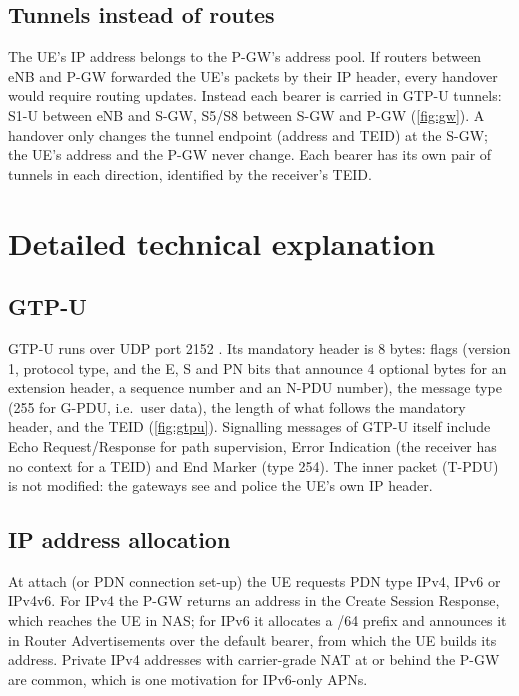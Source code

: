 \documentclass[11pt,a4paper]{article}
\begin{document}
\subsection{Tunnels instead of routes}
The UE's IP address belongs to the P-GW's address pool. If routers between eNB and P-GW forwarded the
UE's packets by their IP header, every handover would require routing updates. Instead each bearer is
carried in GTP-U tunnels: S1-U between eNB and S-GW, S5/S8 between S-GW and P-GW (\cref{fig:gw}). A
handover only changes the tunnel endpoint (address and TEID) at the S-GW; the UE's address and the
P-GW never change. Each bearer has its own pair of tunnels in each direction, identified by the
receiver's TEID.

\begin{acnfigure}
  \caption{S-GW and P-GW on the user-plane path with their main functions.}
  \label{fig:gw}
\end{acnfigure}

\section{Detailed technical explanation}

\subsection{GTP-U}
GTP-U runs over UDP port 2152 \cite{ts29281}. Its mandatory header is 8 bytes: flags (version 1,
protocol type, and the E, S and PN bits that announce 4 optional bytes for an extension header, a sequence
number and an N-PDU number), the message type (255 for G-PDU, i.e.\ user data), the length of what follows
the mandatory header, and the TEID (\cref{fig:gtpu}). Signalling messages of GTP-U itself include Echo
Request/Response for path supervision, Error Indication (the receiver has no context for a TEID) and End
Marker (type 254). The inner packet (T-PDU) is not modified: the gateways see and police the UE's own IP
header.

\begin{acnfigure}
  \caption{GTP-U encapsulation of a user packet and the mandatory GTP-U header.}
  \label{fig:gtpu}
\end{acnfigure}

\subsection{IP address allocation}
At attach (or PDN connection set-up) the UE requests PDN type IPv4, IPv6 or IPv4v6. For IPv4 the P-GW
returns an address in the Create Session Response, which reaches the UE in NAS; for IPv6 it allocates a
/64 prefix and announces it in Router Advertisements over the default bearer, from which the UE builds
its address. Private IPv4 addresses with carrier-grade NAT at or behind the P-GW are common, which is one
motivation for IPv6-only APNs.
\end{document}
